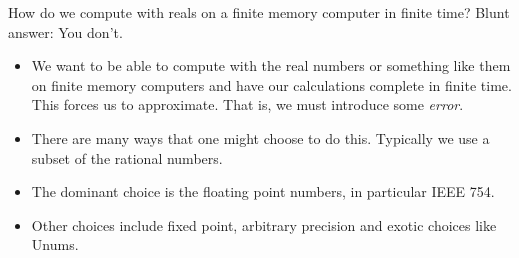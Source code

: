\documentclass{beamer}
\begin{document}
\begin{frame}{How do we compute with reals on a finite memory computer in finite time?}
Blunt answer: You don't.
\begin{itemize}
\item We want to be able to compute with the real numbers or something like them on finite memory computers and 
have our calculations complete in finite time. This forces us to approximate. That is, we must introduce
some \emph{error}. \\
\item There are many ways that one might choose to do this. Typically we use a subset of
the rational numbers. \\
\item The dominant choice is the floating point numbers, in particular IEEE 754. \\
\item Other choices include fixed point, arbitrary precision and exotic choices like Unums.
\end{itemize}
\end{frame}


\end{document}
